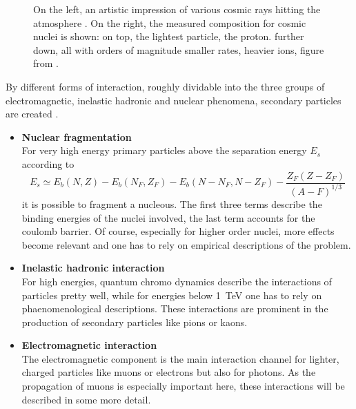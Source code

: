 \begin{figure}
\begin{minipage}[d]{0.49 \textwidth}
	\end{minipage}
	\caption[Cosmic ray composition]{On the left, an artistic impression of various cosmic rays hitting the atmosphere \cite{airShower}. On the right, the measured composition for cosmic nuclei is shown: on top, the lightest particle, the proton. further down, all with orders of magnitude smaller rates, heavier ions, figure from \cite{highEnergyCosmicRays}.}
	\label{fig:Introduction:sec:CosmicRays}
    \end{figure}
    By different forms of interaction, roughly dividable into the three groups of electromagnetic, inelastic hadronic and nuclear phenomena, secondary particles are created \cite{highEnergyCosmicRays, Grupen}. 
    \begin{itemize}
    	\item {\bf Nuclear fragmentation}\\
    	For very high energy primary particles above the separation energy $E_s$ according to 
		\begin{equation}
			E_s \simeq E_b(N,Z) - E_b(N_F, Z_F) - E_b(N - N_F, N - Z_F) - \frac{Z_F(Z -Z_F)}{(A-F)^{1/3}}
		\end{equation}
		it is possible to fragment a nucleous. The first three terms describe the binding energies of the nuclei involved, the last term accounts for the coulomb barrier. Of course, especially for higher order nuclei, more effects become relevant and one has to rely on empirical descriptions of the problem.
		\item{\bf Inelastic hadronic interaction}\\
		For high energies, quantum chromo dynamics describe the interactions of particles pretty well, while for energies below \SI{1}{\TeV} one has to rely on phaenomenological descriptions. These interactions are prominent in the production of secondary particles like pions or kaons.
		
		\item{\bf Electromagnetic interaction}\\
		The electromagnetic component is the main interaction channel for lighter, charged particles like muons or electrons but also for photons. As the propagation of muons is especially important here, these interactions will be described in some more detail.
	

\end{itemize}
